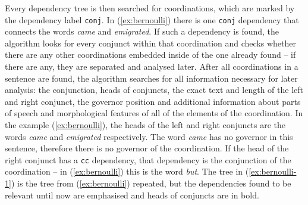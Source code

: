 \vspace{2ex}
\begin{exe}
\ex\label{ex:bernoulli}
\end{exe}
\vspace{1ex}

Every dependency tree is then searched for coordinations, which are marked by the dependency label \texttt{conj}. In (\ref{ex:bernoulli}) there is one \texttt{conj} dependency that connects the words \textsl{came} and \textsl{emigrated}. If such a dependency is found, the algorithm looks for every conjunct within that coordination and checks whether there are any other coordinations embedded inside of the one already found -- if there are any, they are separated and analysed later. After all coordinations in a sentence are found, the algorithm searches for all information necessary for later analysis: the conjunction, heads of conjuncts, the exact text and length of the left and right conjunct, the governor position and additional information about parts of speech and morphological features of all of the elements of the coordination. In the example (\ref{ex:bernoulli}), the heads of the left and right conjuncts are the words \textsl{came} and \textsl{emigrated} respectively. The word \textsl{came} has no governor in this sentence, therefore there is no governor of the coordination. If the head of the right conjunct has a \texttt{cc} dependency, that dependency is the conjunction of the coordination -- in (\ref{ex:bernoulli}) this is the word \textsl{but}. The tree in (\ref{ex:bernoulli-1}) is the tree from (\ref{ex:bernoulli}) repeated, but the dependencies found to be relevant until now are emphasised and heads of conjuncts are in bold. 


